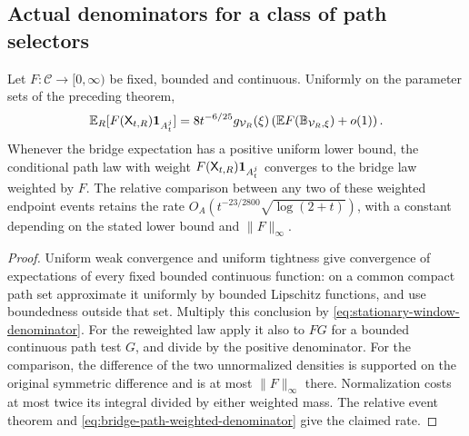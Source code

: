 \subsection{Actual denominators for a class of path selectors}
\begin{corollary}
\label{cor:bridge-path-weighted-denominator}
Let $F:\mathcal C\to[0,\infty)$ be fixed, bounded and continuous.
Uniformly on the parameter sets of the preceding theorem,
\begin{align}
 \mathbb E_R[F(\mathsf X_{t,R})\one_{A_t^j}]
  =8t^{-6/25}g_{\mathcal V_R}(\xi)
        \left(\mathbb E F(\mathbb B_{\mathcal V_R,\xi})+o(1)\right).
 \label{eq:bridge-path-weighted-denominator}
\end{align}
Whenever the bridge expectation has a positive uniform lower bound,
the conditional path law with weight $F(\mathsf X_{t,R})\mathbf1_{A_t^j}$
converges to the bridge law weighted by $F$. The relative comparison
between any two of these weighted endpoint events retains the rate
$O_A(t^{-23/2800}\sqrt{\log(2+t)})$, with a constant depending on
the stated lower bound and $\|F\|_\infty$.
\end{corollary}
\begin{proof}
Uniform weak convergence and uniform tightness give convergence of
expectations of every fixed bounded continuous function: on a common
compact path set approximate it uniformly by bounded Lipschitz
functions, and use boundedness outside that set. Multiply this
conclusion by \eqref{eq:stationary-window-denominator}.
For the reweighted law apply it also to $FG$ for a bounded continuous
path test $G$, and divide by the positive denominator.
For the comparison, the difference of the two unnormalized densities
is supported on the original symmetric difference and is at most
$\|F\|_\infty$ there. Normalization costs at most twice its integral
divided by either weighted mass. The relative event theorem and
\eqref{eq:bridge-path-weighted-denominator} give the claimed rate.
\end{proof}

